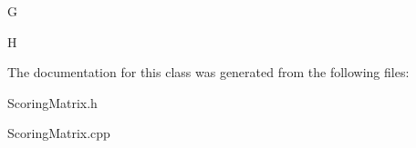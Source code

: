 G

H 

The documentation for this class was generated from the following files\+:\begin{DoxyCompactItemize}
\item 
Scoring\+Matrix.\+h\item 
Scoring\+Matrix.\+cpp\end{DoxyCompactItemize}
